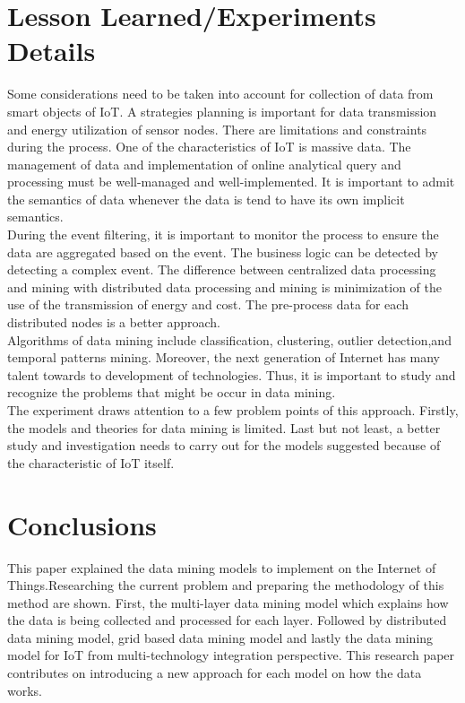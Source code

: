 \documentclass[a4paper,12pt]{article}
\begin{document}
{\section{Lesson Learned/Experiments Details}
Some considerations need to be taken into account for collection of data from smart objects of IoT. A strategies planning is important for data transmission and energy utilization of sensor nodes. There are limitations and constraints during the process.
One of the characteristics of IoT is massive data. The management of data and implementation of online analytical query and processing must be well-managed and well-implemented. It is important to admit the semantics of data whenever the data is tend to have its own implicit semantics.\\
\indent
During the event filtering, it is important to monitor the process to ensure the data are aggregated based on the event. The business logic can be detected by detecting a complex event. The difference between centralized data processing and mining with distributed data processing and mining is minimization of the use of the transmission of energy and cost. The pre-process data for each distributed nodes is a better approach.\\
\indent
Algorithms of data mining include classification, clustering, outlier detection,and temporal patterns mining. Moreover, the next generation of Internet has many talent towards to development of technologies. Thus, it is important to study and recognize the problems that might be occur in data mining.\\
\indent
The experiment draws attention to a few problem points of this approach. Firstly, the models and theories for data mining is limited. Last but not least, a better study and investigation needs to carry out for the models suggested because  of  the characteristic of IoT itself.  
\section{Conclusions}
This paper explained the data mining models to implement on the Internet of Things.Researching the current problem and preparing the methodology of this method are shown. First, the multi-layer data mining model which explains how the data is being collected and processed for each layer. Followed by distributed data mining model, grid based data mining model and lastly the data mining model for IoT from multi-technology integration perspective. This research paper contributes on introducing a new approach for each model on how the data works.
}
\end{document}
